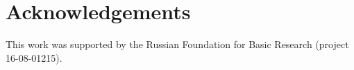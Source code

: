 \documentclass[a4paper,12pt]{article}
\begin{document}
	
	
	\pagebreak
	
	\section*{Acknowledgements}
	This work was supported by the Russian Foundation for 			Basic Research (project 16-08-01215).

	
	
\end{document}
